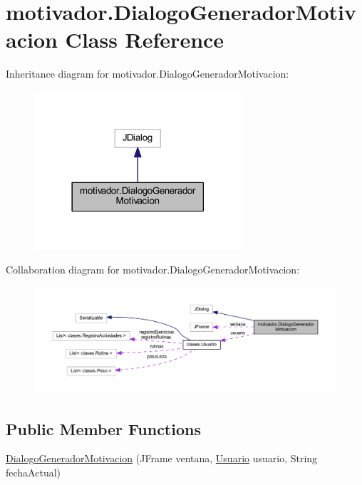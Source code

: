 \hypertarget{classmotivador_1_1_dialogo_generador_motivacion}{}\section{motivador.\+Dialogo\+Generador\+Motivacion Class Reference}
\label{classmotivador_1_1_dialogo_generador_motivacion}


Inheritance diagram for motivador.\+Dialogo\+Generador\+Motivacion\+:
\nopagebreak
\begin{figure}[H]
\begin{center}
\leavevmode
\includegraphics[width=218pt]{classmotivador_1_1_dialogo_generador_motivacion__inherit__graph}
\end{center}
\end{figure}


Collaboration diagram for motivador.\+Dialogo\+Generador\+Motivacion\+:
\nopagebreak
\begin{figure}[H]
\begin{center}
\leavevmode
\includegraphics[width=350pt]{classmotivador_1_1_dialogo_generador_motivacion__coll__graph}
\end{center}
\end{figure}
\subsection*{Public Member Functions}
\begin{DoxyCompactItemize}
\item 
\mbox{\hyperlink{classmotivador_1_1_dialogo_generador_motivacion_adb06fc95a81a1d0670512a66eee9f0fc}{Dialogo\+Generador\+Motivacion}} (J\+Frame ventana, \mbox{\hyperlink{classclases_1_1_usuario}{Usuario}} usuario, String fecha\+Actual)
\end{DoxyCompactItemize}



